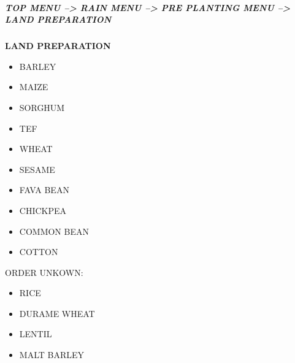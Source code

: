 \documentclass[
]{article}
\providecommand{\tightlist}{%
  \setlength{\itemsep}{0pt}\setlength{\parskip}{0pt}}
\begin{document}
\hypertarget{top-menu-rain-menu-pre-planting-menu-land-preparation}{%
\subparagraph{TOP MENU --\textgreater{} RAIN MENU --\textgreater{} PRE
PLANTING MENU --\textgreater{} LAND
PREPARATION}\label{top-menu-rain-menu-pre-planting-menu-land-preparation}}

\textbf{LAND PREPARATION}

\begin{itemize}
\tightlist
\item
  BARLEY
\item
  MAIZE
\item
  SORGHUM
\item
  TEF
\item
  WHEAT
\item
  SESAME
\item
  FAVA BEAN
\item
  CHICKPEA
\item
  COMMON BEAN
\item
  COTTON
\end{itemize}

ORDER UNKOWN:

\begin{itemize}
\tightlist
\item
  RICE
\item
  DURAME WHEAT
\item
  LENTIL
\item
  MALT BARLEY
\end{itemize}
\end{document}
